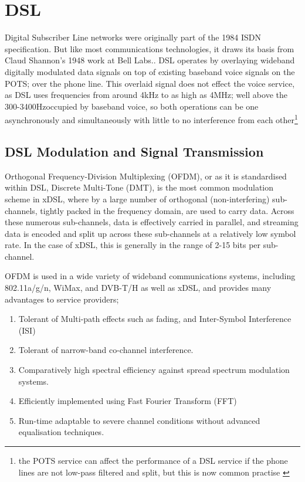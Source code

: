 \section{DSL}
Digital Subscriber Line networks were originally part of the 1984 ISDN specification. But like most communications technologies, it draws its basis from Claud Shannon's 1948 work at Bell Labs.\cite{CS48}. DSL operates by overlaying wideband digitally modulated data signals on top of existing baseband voice signals on the POTS; over the phone line. This overlaid signal does not effect the voice service, as DSL uses frequencies from around 4kHz to as high as 4MHz; well above the 300-3400Hzoccupied by baseband voice, so both operations can be one asynchronously and simultaneously with little to no interference from each other\footnote{the POTS service can affect the performance of a DSL service if the phone lines are not low-pass filtered and split, but this is now common practise \cite{TS03}}

\subsection{DSL Modulation and Signal Transmission}
Orthogonal Frequency-Division Multiplexing (OFDM), or as it is standardised within DSL\cite{JACB90}, Discrete Multi-Tone (DMT), is the most common modulation scheme in xDSL, where by a large number of orthogonal (non-interfering) sub-channels, tightly packed in the frequency domain, are used to carry data. Across these numerous sub-channels, data is effectively carried in parallel, and streaming data is encoded and split up across these sub-channels at a relatively low symbol rate\cite{JMC91}. In the case of xDSL, this is generally in the range of 2-15 bits per sub-channel\cite{TS03}.

OFDM is used in a wide variety of wideband communications systems, including 802.11a/g/n, WiMax, and DVB-T/H as well as xDSL, and provides many advantages to service providers\cite{VAR};

\begin{enumerate}
  \item Tolerant of Multi-path effects such as fading, and Inter-Symbol Interference (ISI)
  \item Tolerant of narrow-band co-channel interference.
  \item Comparatively high spectral efficiency against spread spectrum modulation systems.
  \item Efficiently implemented using Fast Fourier Transform (FFT)
  \item Run-time adaptable to severe channel conditions without advanced equalisation techniques.
\end{enumerate}

